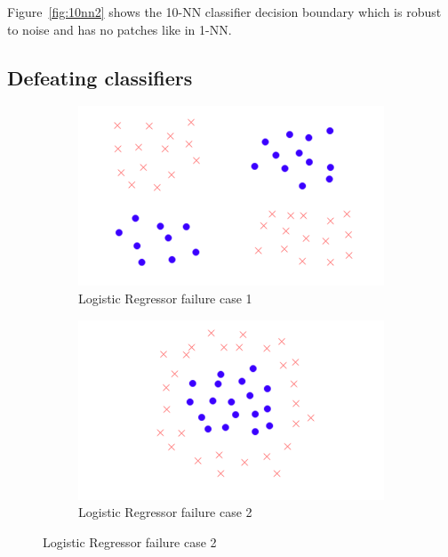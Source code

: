 \documentclass[letterpaper,10pt]{article} %
\begin{document}
Figure~\ref{fig:10nn2} shows the 10-NN classifier decision boundary which is robust to noise and has no patches like in 1-NN.

\subsection{Defeating classifiers}

\begin{figure}[h]
\centering
\begin{subfigure}[b]{\textwidth}
\includegraphics[width=\textwidth]{handout/3-2/logistic1}
\caption{Logistic Regressor failure case 1}
\label{fig:faillr1}
\end{subfigure}%

\begin{subfigure}[b]{\textwidth}
\includegraphics[width=\textwidth]{handout/3-2/logistic2}
\caption{Logistic Regressor failure case 2}
\label{fig:faillr2}
\end{subfigure}


\end{figure}
\end{document}
